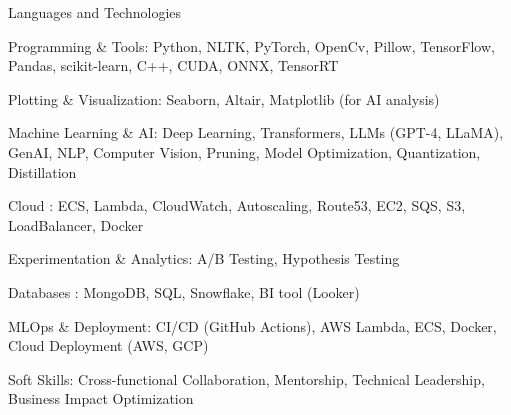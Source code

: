 

\begin{cventries}

  \cventry
    {Languages and Technologies}
    {}
    {}
    {}
    {
     \begin{cvitems} %
      \item {Programming \& Tools: Python, NLTK, PyTorch, OpenCv, Pillow, TensorFlow, Pandas, 
        scikit-learn, C++, CUDA, ONNX, TensorRT}	
      \item {Plotting \& Visualization: Seaborn, Altair, Matplotlib (for AI analysis)}
      \item {Machine Learning \& AI: Deep Learning, Transformers, LLMs (GPT-4, LLaMA), GenAI, NLP, 
        Computer Vision, Pruning, Model Optimization, Quantization, Distillation}	
      \item {Cloud : ECS, Lambda, CloudWatch, Autoscaling, Route53, EC2, SQS, S3, LoadBalancer, Docker}
      \item {Experimentation \& Analytics:  A/B Testing, Hypothesis Testing}
	    \item {Databases : MongoDB, SQL, Snowflake, BI tool (Looker)}
      \item {MLOps \& Deployment: CI/CD (GitHub Actions), AWS Lambda, ECS, Docker, Cloud Deployment (AWS, GCP)}
      \item {Soft Skills: Cross-functional Collaboration, Mentorship, Technical Leadership, Business Impact Optimization}
     \end{cvitems}
    }

\end{cventries}
